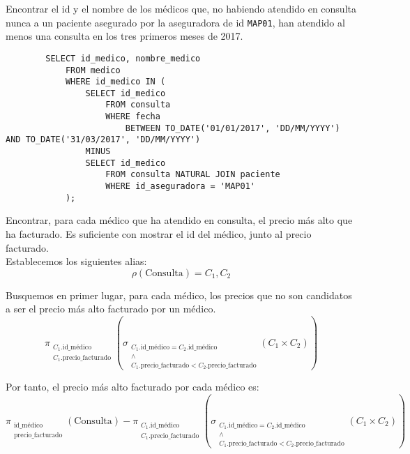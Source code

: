 \documentclass[12pt]{article}
\begin{document}
\begin{ejercicio}[SQL]
    Encontrar el id y el nombre de los médicos que, no habiendo atendido en consulta nunca a un paciente asegurado por la aseguradora de id \verb|MAP01|, han atendido al menos una consulta en los tres primeros meses de 2017.\\
    \begin{verbatim}
        SELECT id_medico, nombre_medico
            FROM medico
            WHERE id_medico IN (
                SELECT id_medico
                    FROM consulta
                    WHERE fecha
                        BETWEEN TO_DATE('01/01/2017', 'DD/MM/YYYY') AND TO_DATE('31/03/2017', 'DD/MM/YYYY')
                MINUS
                SELECT id_medico
                    FROM consulta NATURAL JOIN paciente
                    WHERE id_aseguradora = 'MAP01'
            );
    \end{verbatim}
\end{ejercicio}

\begin{ejercicio}[AR]
    Encontrar, para cada médico que ha atendido en consulta, el precio más alto que ha facturado. Es suficiente con mostrar el id del médico, junto al precio facturado.\\

    Establecemos los siguientes alias:
    \begin{equation*}
        \rho(\text{Consulta})=C_1,C_2
    \end{equation*}
    
    Busquemos en primer lugar, para cada médico, los precios que no son candidatos a ser el precio más alto facturado por un médico.
    \begin{equation*}
        \pi_{\substack{C_1.\text{id\_médico}\\C_1.\text{precio\_facturado}}}\left(\sigma_{\substack{C_1.\text{id\_médico}=C_2.\text{id\_médico}\\\land\\C_1.\text{precio\_facturado}<C_2.\text{precio\_facturado}}}(C_1\times C_2)\right)
    \end{equation*}

    Por tanto, el precio más alto facturado por cada médico es:
    \begin{equation*}
        \pi_{\substack{\text{id\_médico}\\\text{precio\_facturado}}}\left(\text{Consulta}\right)
        -
        \pi_{\substack{C_1.\text{id\_médico}\\C_1.\text{precio\_facturado}}}\left(\sigma_{\substack{C_1.\text{id\_médico}=C_2.\text{id\_médico}\\\land\\C_1.\text{precio\_facturado}<C_2.\text{precio\_facturado}}}(C_1\times C_2)\right)
    \end{equation*}
\end{ejercicio}
\end{document}
